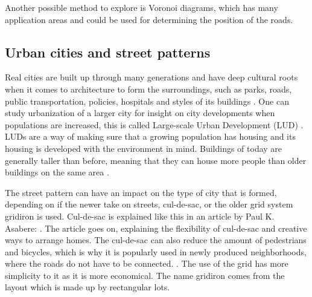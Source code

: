 Another possible method to explore is Voronoi diagrams, which has many application areas and could be used for determining the position of the roads.



\subsection{Urban cities and street patterns}
Real cities are built up through many generations and have deep cultural roots when it comes to architecture to form the surroundings, such as parks, roads, public transportation, policies, hospitals and styles of its buildings \cite{CityArchitecture}. One can study urbanization of a larger city for insight on city developments when populations are increased, this is called Large-scale Urban Development (LUD) \cite{UrbanCity}. LUDs are a way of making sure that a growing population has housing and its housing is developed with the environment in mind. Buildings of today are generally taller than before, meaning that they can house more people than older buildings on the same area \cite{UrbanCity}.

The street pattern can have an impact on the type of city that is formed, depending on if the newer take on streets, cul-de-sac, or the older grid system gridiron is used. Cul-de-sac is explained like this in an article by Paul K. Asabere:  \cite{streets_pattern}. The article goes on, explaining the flexibility of cul-de-sac and creative ways to arrange homes. The cul-de-sac can also reduce the amount of pedestrians and bicycles, which is why it is popularly used in newly produced neighborhoods, where the roads do not have to be connected.  \cite{streets_pattern}. The use of the grid has more simplicity to it as it is more economical. The name gridiron comes from the layout which is made up by rectangular lots.

